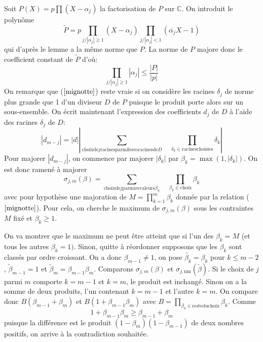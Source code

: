 \documentclass[a4paper,11pt]{article}
\begin{document}
\begin{giacjshere}
Soit $P ( X ) = p \prod ( X - \alpha_j )$ la factorisation de $P$ sur
$\mathbb{C}$. On introduit le polynôme
\[ \tilde{P} = p \prod_{j / | \alpha_j | \geq 1} ( X - \alpha_j )
   \prod_{j / | \alpha_j | < 1} (  \overline{\alpha_j} X - 1 ) \]
qui d'après le lemme a la même norme que $P$. La norme de $P$ majore donc le
coefficient constant de $\tilde{P} $ d'où:
\begin{equation}
  \label{mignotte} \prod_{j / | \alpha_j | \geq 1} | \alpha_j |
  \leq \frac{| P |}{| p |}
\end{equation}
On remarque que (\(\ref{mignotte}\)) reste vraie si on considère les
racines $\delta_j$ de norme plus grande que 1 d'un diviseur $D$ de $P$ puisque
le produit porte alors sur un sous-ensemble. On écrit maintenant l'expression
des coefficients $d_j$ de $D$ à l'aide des racines $\delta_j$ de $D$:
\[ | d_{m - j} | = | d | \left| \sum_{\mbox{choix} \mbox{de} j \mbox{racines}
   \mbox{parmi} \mbox{les} m \mbox{racines} \mbox{de} D} \quad  \prod_{\delta_k \in
   \mbox{racines} \mbox{choisies}} \delta_k \right| \]
Pour majorer $| d_{m - j} |$, on commence par majorer $| \delta_k |$ par
$\beta_k = \max ( 1, | \delta_k | )$. On est donc ramené à majorer
\[ \sigma_{j, m} ( \beta ) = \sum_{\mbox{choix} \mbox{de} j \mbox{parmi} m
   \mbox{valeurs} \beta_k} \quad \prod_{\beta_k \in \mbox{choix}} \beta_k  \]
avec pour hypothèse une majoration de $M = \prod_{k = 1}^m \beta_k$ donnée par
la relation (\(\ref{mignotte}\)). Pour cela, on cherche le maximum de $\sigma_{j,
m} ( \beta )$ sous les contraintes $M$ fixé et $\beta_k \geq 1$.

On va montrer que le maximum ne peut être atteint que si l'un des $\beta_k =
M$ (et tous les autres $\beta_k = 1 )$. Sinon, quitte à réordonner supposons
que les $\beta_k$ sont classés par ordre croissant. On a donc $\beta_{m - 1}
\neq 1$, on pose $\widetilde{\beta_k} = \beta_k$ pour $k \leq m - 2$,
$\tilde{\beta}_{m - 1} = 1$ et $\tilde{\beta}_m = \beta_{m - 1} \beta_m$.
Comparons $\sigma_{j, m} ( \beta )$ et $\sigma_{j, \mbox{nm}} ( \tilde{\beta}
)$. Si le choix de $j$ parmi $m$ comporte $k = m - 1$ et $k = m$, le produit
est inchangé. Sinon on a la somme de deux produits, l'un contenant $k = m - 1$
et l'autre $k = m$. On compare donc $B ( \beta_{m - 1} + \beta_m )$ et $B ( 1
+ \beta_{m - 1} \beta_m )$ avec $B = \prod_{\beta_k \in \mbox{reste} \mbox{du}
\mbox{choix}} \beta_k$. Comme
\[ 1 + \beta_{m - 1} \beta_m \geq \beta_{m - 1} + \beta_m \]
puisque la différence est le produit $(1-\beta_m)(1-\beta_{m-1})$ de deux
nombres positifs, on arrive à la contradiction souhaitée.


\end{giacjshere}
\end{document}
